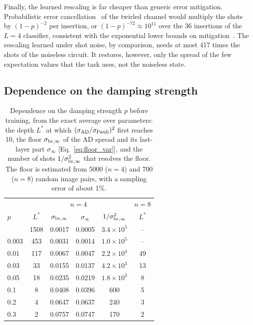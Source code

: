\documentclass[
 aps,pra,
 twocolumn,
 superscriptaddress,
 longbibliography,
 nofootinbib
]{revtex4-2}
\newcommand{\AD}{\mathrm{AD}}
\begin{document}
Finally, the learned rescaling is far
cheaper than generic error mitigation. Probabilistic error
cancellation~\cite{temme2017error} of the twirled channel would multiply the
shots by $(1-p)^{-2}$ per insertion, or $(1-p)^{-72}\approx10^{11}$ over the 36
insertions of the $L=4$ classifier, consistent with the exponential lower
bounds on mitigation~\cite{takagi2023universal,quek2024exponentially}. The
rescaling learned under shot noise, by comparison, needs at most 417 times the
shots of the noiseless circuit. It restores, however, only the spread of the few
expectation values that the task uses, not the noiseless state.

\subsection{Dependence on the damping strength}
\label{sec:pdep}

\begin{table}[t]
\caption{Dependence on the damping strength $p$ before training, from the
exact average over parameters: the depth $L^*$ at which
$(\sigma_{\AD}/\sigma_{\rm Pauli})^2$ first reaches 10, the floor
$\sigma_{\rm br,\infty}$ of the AD spread and its last-layer part $\sigma_\infty$
[Eq.~\eqref{eq:floor_var}], and the number of shots
$1/\sigma_{\rm br,\infty}^2$ that resolves the floor. The floor is estimated from 5000 ($n=4$) and 700 ($n=8$) random image pairs, with a sampling error of about 1\%.}
\label{tab:pdep}
\begin{ruledtabular}
\begin{tabular}{lccccc}
 & \multicolumn{4}{c}{$n=4$} & $n=8$\\
$p$ & $L^*$ & $\sigma_{\rm br,\infty}$ & $\sigma_\infty$ & $1/\sigma_{\rm br,\infty}^2$ & $L^*$\\
\colrule
0.001 & 1508 & 0.0017 & 0.0005 & $3.4\times10^5$ & --\\
0.003 & 453 & 0.0031 & 0.0014 & $1.0\times10^5$ & --\\
0.01 & 117 & 0.0067 & 0.0047 & $2.2\times10^4$ & 49\\
0.03 & 33 & 0.0155 & 0.0137 & $4.2\times10^3$ & 13\\
0.05 & 18 & 0.0235 & 0.0219 & $1.8\times10^3$ & 8\\
0.1 & 8 & 0.0408 & 0.0396 & 600 & 5\\
0.2 & 4 & 0.0647 & 0.0637 & 240 & 3\\
0.3 & 2 & 0.0757 & 0.0747 & 170 & 2\\
\end{tabular}
\end{ruledtabular}
\end{table}
\end{document}
